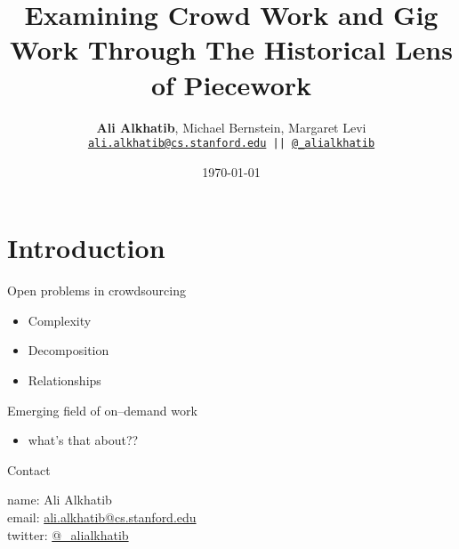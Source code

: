 \documentclass{beamer}
\title{Examining Crowd Work and Gig Work Through The Historical Lens of Piecework}
\author{\textbf{Ali Alkhatib},
                Michael Bernstein,
                Margaret Levi\\
\texttt{ \scriptsize{\href{mailto:ali.alkhatib@cs.stanford.edu}{ali.alkhatib@cs.stanford.edu} ||
         \href{http://twitter.com/_alialkhatib}{@\_alialkhatib}} }}
\institute[Stanford]{Stanford University}
\date{\today}
\begin{document}
\begin{frame}
\titlepage
\end{frame}




\section{Introduction}

\begin{frame}{Open problems in crowdsourcing}
\begin{itemize}[<+- | alert@+>]
  \item Complexity~\cite{suzukiAtelier,KimStoria,yuanAlmost,YuEncouragingOutside,Nebeling:2016:WCW:2858036.2858169,Hahn:2016:KAB:2858036.2858364}
  \item Decomposition
  \item Relationships
\end{itemize}
\end{frame}

\begin{frame}{Emerging field of on--demand work}
\begin{itemize}[<+- | alert@+>]
  \item what's that about??
\end{itemize}
\end{frame}


\begin{frame}{Contact}

    name: {Ali Alkhatib} \\
    email: \href{mailto:ali.alkhatib@cs.stanford.edu}{ali.alkhatib@cs.stanford.edu} \\
    twitter: \href{https://twitter.com/_alialkhatib}{@\_alialkhatib} \\
\end{frame}


% 
\printbibliography{}
\end{document}
